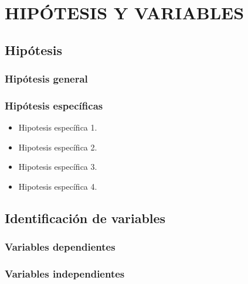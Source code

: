 \newpage
\chapter{HIPÓTESIS Y VARIABLES}
\section{Hipótesis}

\subsection{Hipótesis general}

\lipsum[1][1-3]

\subsection{Hipótesis específicas}

\begin{itemize}
\item Hipotesis específica 1.
\item Hipotesis específica 2.
\item Hipotesis específica 3.
\item Hipotesis específica 4.
\end{itemize}

\section{Identificación de variables}

\lipsum[1]

\subsection{Variables dependientes}

\lipsum[1]

\subsection{Variables independientes}

\lipsum[1-2]

